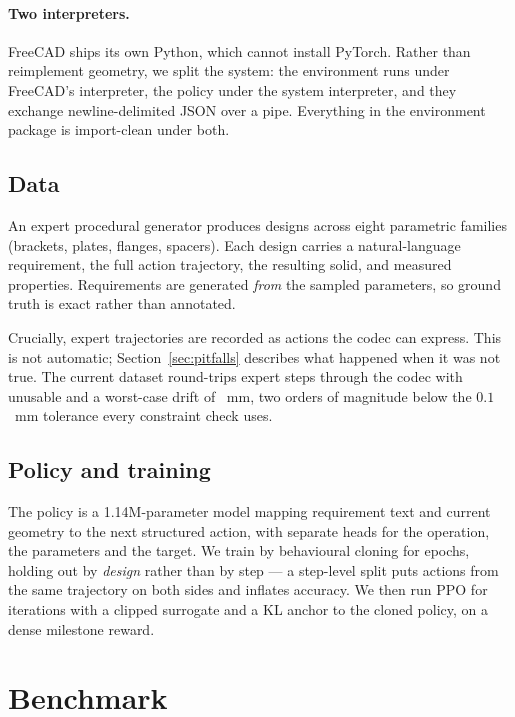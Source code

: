 \documentclass{article}
\begin{document}
\paragraph{Two interpreters.} FreeCAD ships its own Python, which cannot install
PyTorch. Rather than reimplement geometry, we split the system: the environment
runs under FreeCAD's interpreter, the policy under the system interpreter, and
they exchange newline-delimited JSON over a pipe. Everything in the environment
package is import-clean under both.

\subsection{Data}

An expert procedural generator produces designs across eight parametric families
(brackets, plates, flanges, spacers). Each design carries a natural-language
requirement, the full action trajectory, the resulting solid, and measured
properties. Requirements are generated \emph{from} the sampled parameters, so
ground truth is exact rather than annotated.

Crucially, expert trajectories are recorded as actions the codec can express.
This is not automatic; Section~\ref{sec:pitfalls} describes what happened when it
was not true. The current dataset round-trips \CodecSteps{} expert steps through
the codec with \CodecUnusable{} unusable and a worst-case drift of
\CodecWorstDrift{}~mm, two orders of magnitude below the $0.1$~mm tolerance every
constraint check uses.

\subsection{Policy and training}

The policy is a 1.14M-parameter model mapping requirement text and current
geometry to the next structured action, with separate heads for the operation,
the parameters and the target. We train by behavioural cloning for \BCEpochs{}
epochs, holding out by \emph{design} rather than by step --- a step-level split
puts actions from the same trajectory on both sides and inflates accuracy. We
then run PPO for \PPOIterations{} iterations with a clipped surrogate and a KL
anchor to the cloned policy, on a dense milestone reward.

\section{Benchmark}\label{sec:benchmark}
\end{document}
